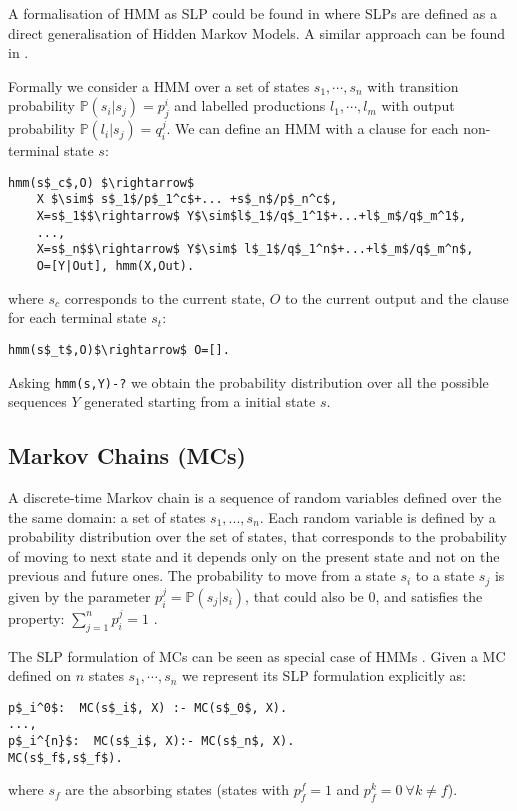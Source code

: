 \documentclass[letterpaper]{article}
\theoremstyle{plain}
\theoremstyle{definition}
\theoremstyle{remark}
\theoremstyle{definition}
\begin{document}
A formalisation of HMM as SLP could be found in \cite{SLPmuggleton96} where SLPs are defined as a direct generalisation of Hidden Markov Models. A similar approach can be found in \cite{SLPcussens2001}.

Formally we consider a HMM over a set of states $s_1, \cdots, s_n$ with transition probability $\mathbb{P}(s_i|s_j)=p_j^i$ and labelled productions $l_1, \cdots, l_m$ with output probability $\mathbb{P}(l_i|s_j)=q_i^j$. We can define an HMM with a clause for each non-terminal state $s$:
\begin{lstlisting}[mathescape=true]
hmm(s$_c$,O) $\rightarrow$
	X $\sim$ s$_1$/p$_1^c$+... +s$_n$/p$_n^c$, 
	X=s$_1$$\rightarrow$ Y$\sim$l$_1$/q$_1^1$+...+l$_m$/q$_m^1$,
	...,
	X=s$_n$$\rightarrow$ Y$\sim$ l$_1$/q$_1^n$+...+l$_m$/q$_m^n$,
	O=[Y|Out], hmm(X,Out).
\end{lstlisting}
\noindent where $s_c$ corresponds to the current state, $O$ to the current output and the clause for each terminal state $s_t$:
\begin{lstlisting}[mathescape=true]
hmm(s$_t$,O)$\rightarrow$ O=[].
\end{lstlisting}

Asking \lstinline[mathescape=true]{hmm(s,Y)-?} we obtain the probability distribution over all the possible sequences $Y$ generated starting from a initial state $s$.


\subsection{Markov Chains (MCs)}

A discrete-time Markov chain is a sequence of random variables defined over the the same domain: a set of states $s_1, ... , s_n$. Each random variable is defined by a probability distribution over the set of states, that corresponds to the probability of moving to next state and it depends only on the present state and not on the previous and future ones. The probability to move from a state $s_i$ to a state $s_j$ is given by the parameter $p_i^j= \mathbb{P} (s_j |s_i)$, that could also be $0$, and satisfies the property: $\sum_{j=1}^n p_i^j =1$ .

The SLP formulation of MCs can be seen as special case of HMMs \cite{SLPmuggleton96,SLPcussens2001}.
Given a MC defined on $n$ states $s_1, \cdots , s_n$ we represent its SLP formulation explicitly as:
\begin{lstlisting}[mathescape=true]
p$_i^0$:  MC(s$_i$, X) :- MC(s$_0$, X).
...,
p$_i^{n}$:  MC(s$_i$, X):- MC(s$_n$, X).
MC(s$_f$,s$_f$).
\end{lstlisting}
where $s_f$ are the absorbing states (states with $p_f^f=1$ and $p_f^k=0 ~ \forall k \not=f$).
\end{document}
